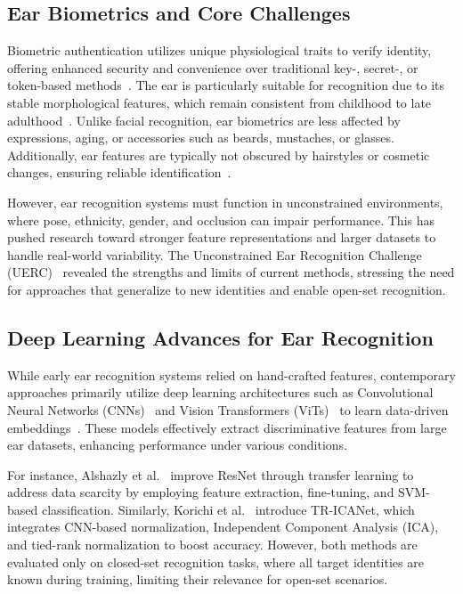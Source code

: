 \documentclass[a4paper, 10pt, conference]{ieeeconf}
\begin{document}
\subsection{Ear Biometrics and Core Challenges} Biometric authentication utilizes unique physiological traits to verify identity, offering enhanced security and convenience over traditional key-, secret-, or token-based methods~\cite{Dargan_biometrics_survey}. The ear is particularly suitable for recognition due to its stable morphological features, which remain consistent from childhood to late adulthood~\cite{Ibrahim_effect_ears_age}. Unlike facial recognition, ear biometrics are less affected by expressions, aging, or accessories such as beards, mustaches, or glasses. Additionally, ear features are typically not obscured by hairstyles or cosmetic changes, ensuring reliable identification~\cite{Benzaoui_survey_earrec}.

However, ear recognition systems must function in unconstrained environments, where pose, ethnicity, gender, and occlusion can impair performance. This has pushed research toward stronger feature representations and larger datasets to handle real-world variability. The Unconstrained Ear Recognition Challenge (UERC)~\cite{uerc2023,uerc2019,uerc2017} revealed the strengths and limits of current methods, stressing the need for approaches that generalize to new identities and enable open-set recognition.

\subsection{Deep Learning Advances for Ear Recognition}
While early ear recognition systems relied on hand-crafted features, contemporary approaches primarily utilize deep learning architectures such as Convolutional Neural Networks (CNNs)~\cite{Emersic2019} and Vision Transformers (ViTs)~\cite{alexey_VIT} to learn data-driven embeddings~\cite{Ziga_ear_recog_review}. These models effectively extract discriminative features from large ear datasets, enhancing performance under various conditions.

For instance, Alshazly et al.~\cite{Alshazly_Ear_Resnet} improve ResNet through transfer learning to address data scarcity by employing feature extraction, fine-tuning, and SVM-based classification. Similarly, Korichi et al.~\cite{Korichi_TRICA} introduce TR-ICANet, which integrates CNN-based normalization, Independent Component Analysis (ICA), and tied-rank normalization to boost accuracy. However, both methods are evaluated only on closed-set recognition tasks, where all target identities are known during training, limiting their relevance for open-set scenarios.
\end{document}
